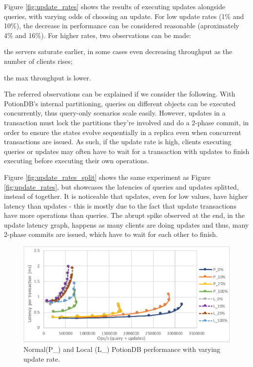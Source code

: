 \documentclass{vldb}
\begin{document}
Figure \ref{fig:update_rates} shows the results of executing updates alongside queries, with varying odds of choosing an update.
For low update rates (1\% and 10\%), the decrease in performance can be considered reasonable (aproximately 4\% and 16\%).
For higher rates, two observations can be made:
\begin{enumerate*}[label=(\roman*)]
	\item the servers saturate earlier, in some cases even decreasing throughput as the number of clients rises;
	\item the max throughput is lower.
\end{enumerate*}

The referred observations can be explained if we consider the following. 
With PotionDB's internal partitioning, queries on different objects can be executed concurrently, thus query-only scenarios scale easily. 
However, updates in a transaction must lock the partitions they're involved and do a 2-phase commit, in order to ensure the states evolve sequentially in a replica even when concurrent transactions are issued.
As such, if the update rate is high, clients executing queries or updates may often have to wait for a transaction with updates to finish executing before executing their own operations.

Figure \ref{fig:update_rates_split} shows the same experiment as Figure \ref{fig:update_rates}, but showcases the latencies of queries and updates splitted, instead of together.
It is noticeable that updates, even for low values, have higher latency than updates - this is mostly due to the fact that update transactions have more operations than queries.
The abrupt spike observed at the end, in the update latency graph, happens as many clients are doing updates and thus, many 2-phase commits are issued, which have to wait for each other to finish.

\begin{figure}
	\centering
	\includegraphics[width=.95\linewidth]{updRate_localvsglobal_cut}
	\caption{Normal(P\_) and Local (L\_) PotionDB performance with varying update rate.}
	\label{fig:update_rates_normal_vs_local}
\end{figure}
\end{document}
